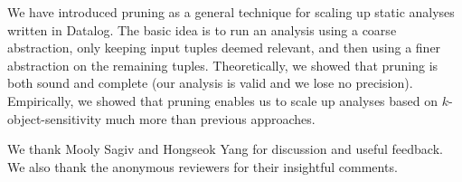 
We have introduced pruning as a general technique for scaling up static analyses
written in Datalog.  The basic idea is to run an analysis using a coarse
abstraction, only keeping input tuples deemed relevant, and then using a finer abstraction on the remaining tuples.
Theoretically, we showed that pruning is both sound and complete (our analysis
is valid and we lose no precision).  Empirically, we showed that pruning
enables us to scale up analyses based on $k$-object-sensitivity much
more than previous approaches.

\acks
We thank Mooly Sagiv and Hongseok Yang for discussion and useful feedback.
We also thank the anonymous reviewers for their insightful comments.
